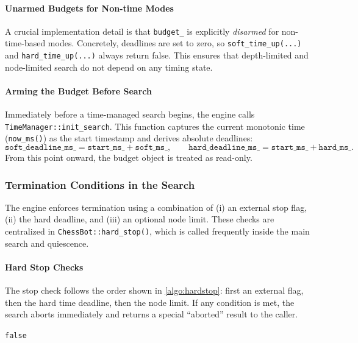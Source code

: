 \paragraph{Unarmed Budgets for Non-time Modes}
A crucial implementation detail is that \texttt{budget\_} is explicitly
\emph{disarmed} for non-time-based modes. Concretely, deadlines are set to zero,
so \texttt{soft\_time\_up(...)} and \texttt{hard\_time\_up(...)} always return
false. This ensures that depth-limited and node-limited search do not depend on
any timing state.

\paragraph{Arming the Budget Before Search}
Immediately before a time-managed search begins, the engine calls
\texttt{TimeManager::init\_search}. This function captures the current monotonic time
(\texttt{now\_ms()}) as the start timestamp and derives absolute deadlines:
\[
\texttt{soft\_deadline\_ms\_} = \texttt{start\_ms\_} + \texttt{soft\_ms\_}, \qquad
\texttt{hard\_deadline\_ms\_} = \texttt{start\_ms\_} + \texttt{hard\_ms\_}.
\]
From this point onward, the budget object is treated as read-only.

\subsubsection{Termination Conditions in the Search}

The engine enforces termination using a combination of (i) an external stop flag,
(ii) the hard deadline, and (iii) an optional node limit. These checks are
centralized in \texttt{ChessBot::hard\_stop()}, which is called frequently inside
the main search and quiescence.

\paragraph{Hard Stop Checks}
The stop check follows the order shown in \cref{algo:hardstop}: first an external
flag, then the hard time deadline, then the node limit. If any condition is met,
the search aborts immediately and returns a special ``aborted'' result to the
caller.

\begin{algorithm}[ht]
\DontPrintSemicolon
{}

\Return \texttt{false}\;
\caption{Immediate termination check (\texttt{hard\_stop()}).}
\label{algo:hardstop}
\end{algorithm}

